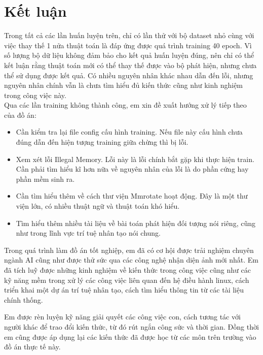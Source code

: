 \documentclass[12pt,a4paper,openany,oneside]{report}
\begin{document}
\chapter*{{Kết luận}}
Trong tất cả các lần huấn luyện trên, chỉ có lần thử với bộ dataset nhỏ cùng với việc thay thế 1 nửa thuật toán là đáp ứng được quá trình training 40 epoch. Vì số lượng bộ dữ liệu không đảm bảo cho kết quả huấn luyện đúng, nên chỉ có thể kết luận rằng thuật toán mới có thể thay thế được vào bộ phát hiện, nhưng chưa thể sử dụng được kết quả. Có nhiều nguyên nhân khác nhau dẫn đến lỗi, nhưng nguyên nhân chính vẫn là chưa tìm hiểu đủ kiến thức cũng như kinh nghiệm trong công việc này.\\
Qua các lần training không thành công, em xin đề xuất hướng xử lý tiếp theo của đồ án:
\begin{itemize}
	\item Cần kiểm tra lại file config cấu hình training. Nếu file này cấu hình chưa đúng dẫn đến hiện tượng training giữa chừng thì bị lỗi.
	\item Xem xét lỗi Illegal Memory. Lỗi này là lỗi chính bắt gặp khi thực hiện train. Cần phải tìm hiểu kĩ hơn nữa về nguyên nhân của lỗi là do phần cứng hay phần mềm sinh ra.
	\item Cần tìm hiểu thêm về cách thư viện Mmrotate hoạt động. Đây là một thư viện lớn, có nhiều thuật ngữ và thuật toán khó hiểu. 
	\item Tìm hiểu thêm nhiều tài liệu về bài toán phát hiện đối tượng nói riêng, cũng như trong lĩnh vực trí tuệ nhân tạo nói chung.
\end{itemize}

Trong quá trình làm đồ án tốt nghiệp, em đã có cơ hội được trải nghiệm chuyên ngành AI cũng như được thử sức qua các công nghệ nhận diện ảnh mới nhất. Em đã tích luỹ được những kinh nghiệm về kiến thức trong công việc cũng như các kỹ năng mềm trong xử lý các công việc liên quan đến hệ điều hành linux, cách triển khai một dự án trí tuệ nhân tạo, cách tìm hiểu thông tin từ các tài liệu chính thống.
 
Em được rèn luyện kỹ năng giải quyết các công việc con, cách tương tác với người khác để trao đổi kiến thức, từ đó rút ngắn công sức và thời gian. Đồng thời em cũng được áp dụng lại các kiến thức đã được học từ các môn trên trường vào đồ án thực tế này.
\end{document}
